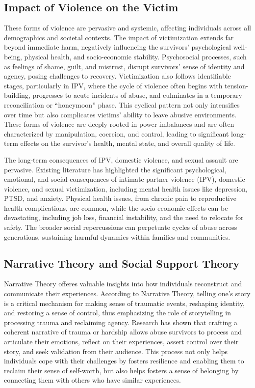 \documentclass[11pt]{article}
\begin{document}
\subsection{Impact of Violence on the Victim}

These forms of violence are pervasive and systemic, affecting individuals across all demographics and societal contexts.
The impact of victimization extends far beyond immediate harm, negatively influencing the survivors' psychological well-being, physical health, and socio-economic stability. 
Psychosocial processes, such as feelings of shame, guilt, and mistrust, disrupt survivors' sense of identity and agency, posing challenges to recovery. 
Victimization also follows identifiable stages, particularly in IPV, where the cycle of violence often begins with tension-building, progresses to acute incidents of abuse, and culminates in a temporary reconciliation or ``honeymoon'' phase. 
This cyclical pattern not only intensifies over time but also complicates victims' ability to leave abusive environments. 
These forms of violence are deeply rooted in power imbalances and are often characterized by manipulation, coercion, and control, leading to significant long-term effects on the survivor's health, mental state, and overall quality of life.

The long-term consequences of IPV, domestic violence, and sexual assault are pervasive. 
Existing literature has highlighted the significant psychological, emotional, and social consequences of intimate partner violence (IPV), domestic violence, and sexual victimization, including mental health issues like depression, PTSD, and anxiety.
Physical health issues, from chronic pain to reproductive health complications, are common, while the socio-economic effects can be devastating, including job loss, financial instability, and the need to relocate for safety. 
The broader social repercussions can perpetuate cycles of abuse across generations, sustaining harmful dynamics within families and communities.

\subsection{Narrative Theory and Social Support Theory}
Narrative Theory offeres valuable insights into how individuals reconstruct and communicate their experiences.
According to Narrative Theory, telling one's story is a critical mechanism for making sense of traumatic events, reshaping identity, and restoring a sense of control, thus emphasizing the role of storytelling in processing trauma and reclaiming agency.
Research has shown that crafting a coherent narrative of trauma or hardship allows abuse survivors to process and articulate their emotions, reflect on their experiences, assert control over their story, and seek validation from their audience. 
This process not only helps individuals cope with their challenges by  fosters resilience and enabling them to reclaim their sense of self-worth, but also helps fosters a sense of belonging by connecting them with others who have similar experiences.
\end{document}
